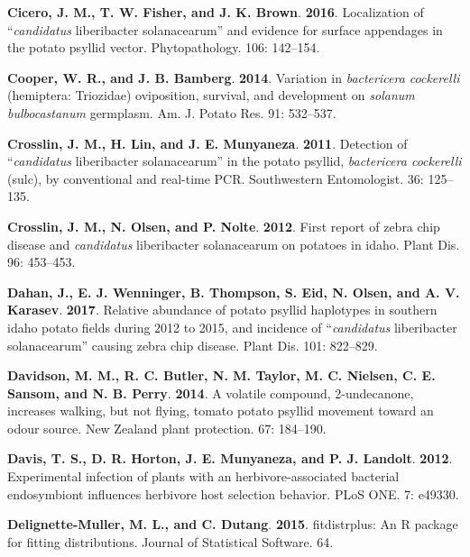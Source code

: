 \documentclass[]{article}
\begin{document}
\leavevmode\hypertarget{ref-Cicero2016}{}%
\textbf{Cicero, J. M., T. W. Fisher, and J. K. Brown}. \textbf{2016}.
Localization of ``\emph{candidatus} liberibacter solanacearum'' and
evidence for surface appendages in the potato psyllid vector.
Phytopathology. 106: 142--154.

\leavevmode\hypertarget{ref-Cooper2014}{}%
\textbf{Cooper, W. R., and J. B. Bamberg}. \textbf{2014}. Variation in
\emph{bactericera cockerelli} (hemiptera: Triozidae) oviposition,
survival, and development on \emph{solanum bulbocastanum} germplasm. Am.
J. Potato Res. 91: 532--537.

\leavevmode\hypertarget{ref-Crosslin2011}{}%
\textbf{Crosslin, J. M., H. Lin, and J. E. Munyaneza}. \textbf{2011}.
Detection of ``\emph{candidatus} liberibacter solanacearum'' in the
potato psyllid, \emph{bactericera cockerelli} (sulc), by conventional
and real-time PCR. Southwestern Entomologist. 36: 125--135.

\leavevmode\hypertarget{ref-Crosslin2012}{}%
\textbf{Crosslin, J. M., N. Olsen, and P. Nolte}. \textbf{2012}. First
report of zebra chip disease and \emph{candidatus} liberibacter
solanacearum on potatoes in idaho. Plant Dis. 96: 453--453.

\leavevmode\hypertarget{ref-Dahan2017}{}%
\textbf{Dahan, J., E. J. Wenninger, B. Thompson, S. Eid, N. Olsen, and
A. V. Karasev}. \textbf{2017}. Relative abundance of potato psyllid
haplotypes in southern idaho potato fields during 2012 to 2015, and
incidence of ``\emph{candidatus} liberibacter solanacearum'' causing
zebra chip disease. Plant Dis. 101: 822--829.

\leavevmode\hypertarget{ref-Davidson2014}{}%
\textbf{Davidson, M. M., R. C. Butler, N. M. Taylor, M. C. Nielsen, C.
E. Sansom, and N. B. Perry}. \textbf{2014}. A volatile compound,
2-undecanone, increases walking, but not flying, tomato potato psyllid
movement toward an odour source. New Zealand plant protection. 67:
184--190.

\leavevmode\hypertarget{ref-Davis2012}{}%
\textbf{Davis, T. S., D. R. Horton, J. E. Munyaneza, and P. J. Landolt}.
\textbf{2012}. Experimental infection of plants with an
herbivore-associated bacterial endosymbiont influences herbivore host
selection behavior. PLoS ONE. 7: e49330.

\leavevmode\hypertarget{ref-Delignette-Muller2015}{}%
\textbf{Delignette-Muller, M. L., and C. Dutang}. \textbf{2015}.
fitdistrplus: An R package for fitting distributions. Journal of
Statistical Software. 64.
\end{document}
